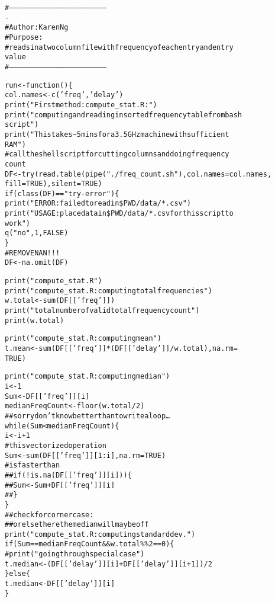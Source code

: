 \documentclass[letterpaper,10pt,english]{/usr/local/lib/python2.7/dist-packages/sphinx/texinputs/sphinxhowto}
\newenvironment{InvisibleVerbatim}
        {\begin{mdframed}[leftmargin=0.1\linewidth,innerleftmargin=3pt,innerrightmargin=3pt, userdefinedwidth=1\linewidth, linewidth=0pt, linecolor=white, usetwoside=false]}
        {\end{mdframed}}
\begin{document}
    

        
        

            
                \begin{InvisibleVerbatim}
                \vspace{-0.5\baselineskip}
\begin{alltt}\#---------------------------------------------------------------------
-
\# Author: Karen Ng
\# Purpose:
\# reads in a two column file with frequency of each entry and entry
value
\#---------------------------------------------------------------------

run <- function()\{
  col.names <- c('freq', 'delay')
  print("First method: compute\_stat.R: ")
  print("computing and reading in sorted frequency table from bash
script")
  print("This takes \textasciitilde{}5 mins for a 3.5 GHz machine with sufficient
RAM")
  \# call the shell script for cutting columns and doing frequency
count
  DF <- try(read.table(pipe("./freq\_count.sh"), col.names = col.names,
                            fill = TRUE), silent=TRUE)
  if (class(DF) == "try-error")\{
    print("ERROR: failed to read in \$PWD/data/*.csv")
    print("USAGE: place data in \$PWD/data/*.csv for this script to
work")
    q("no", 1, FALSE)
  \}
  \# REMOVE NAN!!!
  DF <- na.omit(DF)

  print("compute\_stat.R")
  print("compute\_stat.R: computing total frequencies")
  w.total <- sum(DF[['freq']])
  print("total number of valid total frequency count")
  print(w.total)

  print("compute\_stat.R: computing mean")
  t.mean <- sum(DF[['freq']] * ( DF[['delay']] / w.total), na.rm =
TRUE)

  print("compute\_stat.R: computing median")
  i <- 1
  Sum <- DF[['freq']][i]
  medianFreqCount <- floor(w.total / 2)
  \#\# sorry don't know better than to write a loop\ldots
  while(Sum < medianFreqCount) \{
    i <- i + 1
    \# this vectorized operation
    Sum <- sum(DF[['freq']][1:i], na.rm = TRUE)
    \# is faster than
    \#\# if ( !is.na(DF[['freq']][i]) ) \{
    \#\#   Sum <- Sum + DF[['freq']][i]
    \#\# \}
  \}
  \#\# check for corner case:
  \#\# or else there the median will may be off
  print("compute\_stat.R: computing standard dev.")
  if( Sum == medianFreqCount \&\&  w.total \%\% 2 == 0)\{
    \# print("going through special case")
    t.median <- (DF[['delay']][i] + DF[['delay']][i+1])/2
  \}else\{
    t.median <- DF[['delay']][i]
  \}


\end{alltt}
\end{InvisibleVerbatim}
\end{document}
